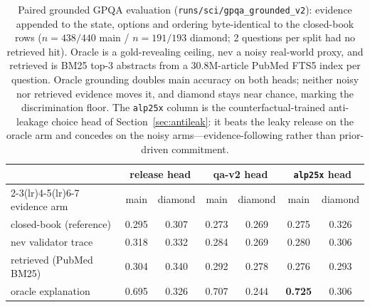 \documentclass[11pt]{article}
\begin{document}
\begin{table}[htbp]
\centering\small
\begin{tabular}{lcccccc}
\toprule
 & \multicolumn{2}{c}{release head} & \multicolumn{2}{c}{qa-v2 head} &
 \multicolumn{2}{c}{\texttt{alp25x} head} \\
\cmidrule(lr){2-3}\cmidrule(lr){4-5}\cmidrule(lr){6-7}
evidence arm & main & diamond & main & diamond & main & diamond \\
\midrule
closed-book (reference) & 0.295 & 0.307 & 0.273 & 0.269 & 0.275 &
0.326 \\
nev validator trace     & 0.318 & 0.332 & 0.284 & 0.269 & 0.280 &
0.306 \\
retrieved (PubMed BM25) & 0.304 & 0.340 & 0.292 & 0.278 & 0.276 &
0.293 \\
oracle explanation      & 0.695 & 0.326 & 0.707 & 0.244 &
\textbf{0.725} & 0.306 \\
\bottomrule
\end{tabular}
\caption{Paired grounded GPQA evaluation (\texttt{runs/sci/gpqa\_grounded\_v2}):
evidence appended to the state, options and ordering byte-identical to
the closed-book rows ($n{=}438/440$ main / $n{=}191/193$ diamond; 2
questions per split had no retrieved hit). Oracle is a gold-revealing
ceiling, nev a noisy real-world proxy, and retrieved is BM25 top-3
abstracts from a 30.8M-article PubMed FTS5 index per question. Oracle
grounding doubles main accuracy on both heads; neither noisy nor
retrieved evidence moves it, and diamond stays near chance, marking
the discrimination floor. The \texttt{alp25x} column is the
counterfactual-trained anti-leakage choice head of
Section~\ref{sec:antileak}: it beats the leaky release on the oracle
arm and concedes on the noisy arms---evidence-following rather than
prior-driven commitment.}
\label{tab:grounded-gpqa}
\end{table}
\end{document}
